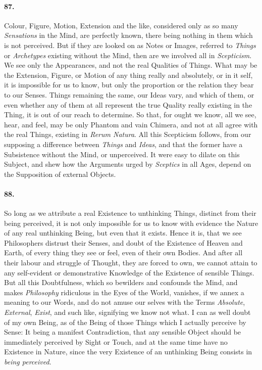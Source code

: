 \documentclass[]{article}
\newenvironment{sectionbody}{\begin{multicols}{2}}{\end{multicols}}
\begin{document}
\begin{sectionbody}
\paragraph{87.} Colour, Figure, Motion, Extension and the like, considered only
as so many \emph{Sensations} in the Mind, are perfectly known,
there being nothing in them which is not perceived.  But if they
are looked on as Notes or Images, referred to \emph{Things} or
\emph{Archetypes} existing without the Mind, then are we
involved all in \emph{Scepticism}.  We see only the
Appearances, and not the real Qualities of Things.  What may be
the Extension, Figure, or Motion of any thing really and
absolutely, or in it self, it is impossible for us to know, but
only the proportion or the relation they bear to our Senses.
Things remaining the same, our Ideas vary, and which of them, or
even whether any of them at all represent the true Quality really
existing in the Thing, it is out of our reach to determine.  So
that, for ought we know, all we see, hear, and feel, may be only
Phantom and vain Chimera, and not at all agree with the real
Things, existing in \emph{Rerum Natura}.  All this Scepticism
follows, from our supposing a difference between \emph{Things}
and \emph{Ideas}, and that the former have a Subsistence
without the Mind, or unperceived.  It were easy to dilate on this
Subject, and shew how the Arguments urged by \emph{Sceptics} in
all Ages, depend on the Supposition of external Objects.



\paragraph{88.} So long as we attribute a real Existence to unthinking Things,
distinct from their being perceived, it is not only impossible
for us to know with evidence the Nature of any real unthinking
Being, but even that it exists.  Hence it is, that we see
Philosophers distrust their Senses, and doubt of the Existence of
Heaven and Earth, of every thing they see or feel, even of their
own Bodies.  And after all their labour and struggle of Thought,
they are forced to own, we cannot attain to any self-evident or
demonstrative Knowledge of the Existence of sensible Things.  But
all this Doubtfulness, which so bewilders and confounds the Mind,
and makes \emph{Philosophy} ridiculous in the Eyes of the
World, vanishes, if we annex a meaning to our Words, and do not
amuse our selves with the Terms \emph{Absolute},
\emph{External}, \emph{Exist}, and such like, signifying we
know not what.  I can as well doubt of my own Being, as of the
Being of those Things which I actually perceive by Sense: It
being a manifest Contradiction, that any sensible Object should
be immediately perceived by Sight or Touch, and at the same time
have no Existence in Nature, since the very Existence of
an unthinking Being consists in \emph{being perceived}.




\end{sectionbody}
\end{document}
